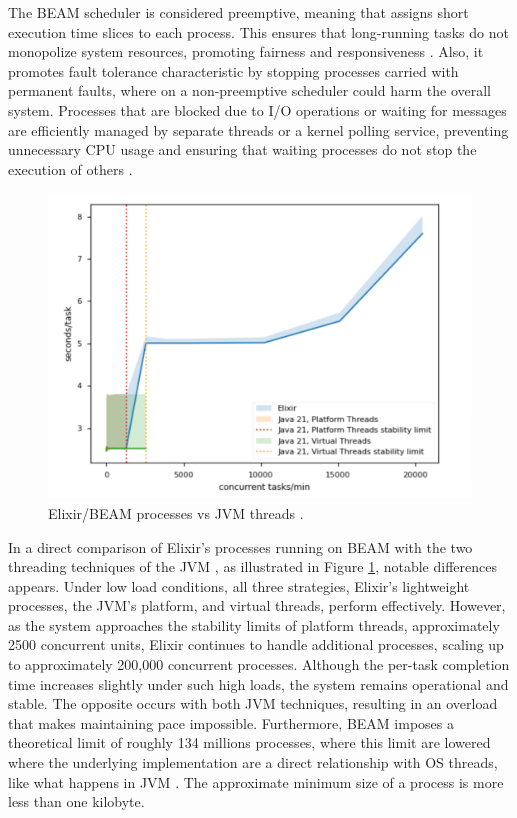 The \gls{BEAM} scheduler is considered preemptive, meaning that assigns short execution time slices to each process. This ensures that long-running tasks do not monopolize system resources, promoting fairness and responsiveness \cite{Armstrong2013}. Also, it promotes fault tolerance characteristic by stopping processes carried with permanent faults, where on a non-preemptive scheduler could harm the overall system. Processes that are blocked due to I/O operations or waiting for messages are efficiently managed by separate threads or a kernel polling service, preventing unnecessary CPU usage and ensuring that waiting processes do not stop the execution of others \cite{Juric2024,erlang-concurrency-blog}.

\begin{figure}
    \centering
    \includegraphics[width=120mm]{ch-state/assets/elixir-vs-jvm-threads.png}
    \caption[Elixir/BEAM processes vs JVM threads]{Elixir/BEAM processes vs JVM threads \cite{erlang-concurrency-blog}.}
    \label{fig:beam-vs-jvm}
\end{figure}

In a direct comparison of Elixir’s processes running on \gls{BEAM} with the two threading techniques of the \gls{JVM} \cite{erlang-concurrency-blog}, as illustrated in Figure \ref{fig:beam-vs-jvm}, notable differences appears. Under low load conditions, all three strategies, Elixir’s lightweight processes, the \gls{JVM}’s platform, and virtual threads, perform effectively. However, as the system approaches the stability limits of platform threads, approximately 2500 concurrent units, Elixir continues to handle additional processes, scaling up to approximately 200,000 concurrent processes. Although the per-task completion time increases slightly under such high loads, the system remains operational and stable. The opposite occurs with both \gls{JVM} techniques, resulting in an overload that makes maintaining pace impossible. Furthermore, \gls{BEAM} imposes a theoretical limit of roughly 134 millions processes, where this limit are lowered where the underlying implementation are a direct relationship with \gls{OS} threads, like what happens in \gls{JVM} \cite{Juric2024}. The approximate minimum size of a process is more less than one kilobyte.

